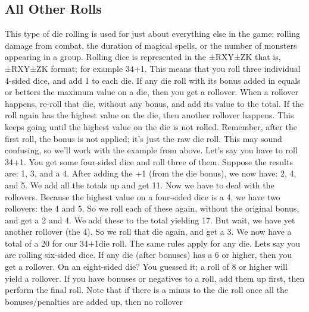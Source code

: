 \documentclass[twoside]{book}
\begin{document}
\subsection{All Other Rolls}
     This type of die rolling is used for just about
               everything else in the game: rolling damage from combat,
               the duration of magical spells, or the number of monsters
               appearing in a group.  Rolling dice is represented in the
                ±RXY±ZK that is,
                ±RXY±ZK format; for
               example 34+1. This means that you roll three individual
               4-sided dice, and add 1 to each die.  If any die roll with its bonus added in equals or
               betters the maximum value on a die, then you get a
               rollover. When a rollover happens, re-roll that die,
               without any bonus, and add its value to the total. If the
               roll again has the highest value on the die, then another
               rollover happens. This keeps going until the highest value
               on the die is not rolled. Remember, after the first roll,
               the bonus is not applied; it's just the raw die
               roll.  This may sound confusing, so we'll work with
               the example from above. Let's say you have to roll
               34+1. You get some four-sided dice and roll three of
               them. Suppose the results are: 1, 3, and a 4. After adding
               the +1 (from the die bonus), we now have: 2, 4, and 5. We
               add all the totals up and get 11. Now we have to deal with
               the rollovers. Because the highest value on a four-sided
               dice is a 4, we have two rollovers: the 4 and 5. So we
               roll each of these again, without the original bonus, and
               get a 2 and 4. We add these to the total yielding 17. But
               wait, we have yet another rollover (the 4). So we roll
               that die again, and get a 3. We now have a total of a 20
               for our 34+1die roll.  The same rules apply for any die. Lets say you are
               rolling six-sided dice. If any die (after bonuses) has a 6
               or higher, then you get a rollover. On an eight-sided die?
               You guessed it; a roll of 8 or higher will yield a
               rollover.  If you have bonuses or negatives to a roll, add them
               up first, then perform the final roll.  Note that if there is a minus to the die roll once
               all the bonuses/penalties are added up, then no rollover
\end{document}
